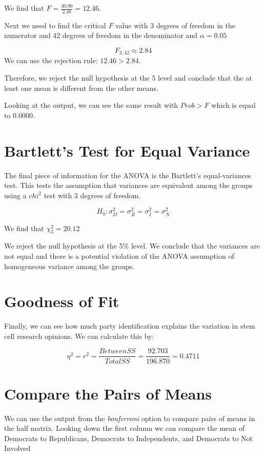 \documentclass[
]{book}
\begin{document}
We find that \(F=\frac{30.90}{2.48}=12.46\).

Next we need to find the critical \(F\) value with 3 degrees of freedom in the numerator and 42 degrees of freedom in the denominator and \(\alpha=0.05\)

\[ F_{3,42} \approx 2.84 \]
We can use the rejection rule: \(12.46 > 2.84\).

Therefore, we reject the null hypothesis at the \(5%
\) level and conclude that the at least one mean is different from the other means.

Looking at the output, we can see the same result with \(Prob > F\) which is equal to \(0.0000\).

\section{Bartlett's Test for Equal Variance}\label{bartletts-test-for-equal-variance}

The final piece of information for the ANOVA is the Bartlett's equal-variances test. This tests the assumption that variances are equivalent among the groups using a \(chi^2\) test with 3 degrees of freedom.

\[ H_0: \sigma^2_D = \sigma^2_R = \sigma^2_I = \sigma^2_N \]

We find that \(\chi^2_{3}=20.12\)

We reject the null hypothesis at the 5\% level. We conclude that the variances are not equal and there is a potential violation of the ANOVA assumption of homogeneous variance among the groups.

\section{Goodness of Fit}\label{goodness-of-fit}

Finally, we can see how much party identification explains the variation in stem cell research opinions. We can calculate this by:

\[ \eta^2 = r^2 = \frac{BetweenSS}{TotalSS}=\frac{92.703}{196.870}=0.4711 \]

\section{Compare the Pairs of Means}\label{compare-the-pairs-of-means}

We can use the output from the \emph{bonferroni} option to compare pairs of means in the half matrix. Looking down the first column we can compare the mean of Democrats to Republicans, Democrats to Independents, and Democrats to Not Involved
\end{document}
